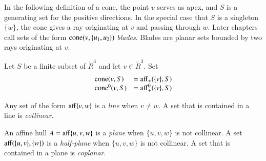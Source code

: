 In the following definition of a cone, the point $v$ serves
as apex, and $S$ is a generating set for the positive directions.
In the special case that $S$ is a singleton $\{w\}$, 
the cone gives
a ray originating at $v$ and passing through $w$.  Later
chapters call sets of the form ${\operatorname{cone}}(v,\{u_1,u_2\})$ {\it blades}.
Blades are planar sets bounded by two rays originating at $v$.

\begin{definition}[cone]
Let $S$ be a finite subset of
$\ring{R}^3$ and let $v\in\ring{R}^3$. Set
  $$\begin{array}{lll}
  {\operatorname{cone}}(v,S) &= {\operatorname{aff}}_+(\{v\},S)\\
  {\operatorname{cone}}^0(v,S) &= {\operatorname{aff}}^0_+(\{v\},S)\\
  \end{array}
  $$
\end{definition}




	
\begin{definition}	
Any set of the form ${\operatorname{aff}}\{v,w\}$ is a {\it line} when $v\ne w$.  A set that is contained in a line is {\it collinear}.
\end{definition}

\begin{definition}	
An affine hull $A={\operatorname{aff}}\{u,v,w\}$ is a {\it plane} when $\{u,v,w\}$ is not collinear.   A set ${\operatorname{aff}}(\{u,v\},\{w\})$
is a {\it half-plane} when $\{u,v,w\}$ is not collinear. A set that is contained in a plane is  {\it coplanar}.
\end{definition}


